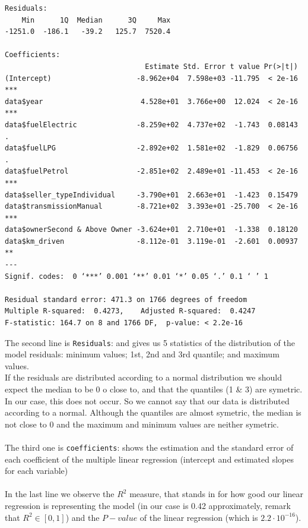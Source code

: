 \documentclass{article}
\begin{document}
\begin{itemize}
\begin{verbatim}
Residuals:
    Min      1Q  Median      3Q     Max 
-1251.0  -186.1   -39.2   125.7  7520.4 

Coefficients:
                                 Estimate Std. Error t value Pr(>|t|)    
(Intercept)                    -8.962e+04  7.598e+03 -11.795  < 2e-16 ***
data$year                       4.528e+01  3.766e+00  12.024  < 2e-16 ***
data$fuelElectric              -8.259e+02  4.737e+02  -1.743  0.08143 .  
data$fuelLPG                   -2.892e+02  1.581e+02  -1.829  0.06756 .  
data$fuelPetrol                -2.851e+02  2.489e+01 -11.453  < 2e-16 ***
data$seller_typeIndividual     -3.790e+01  2.663e+01  -1.423  0.15479    
data$transmissionManual        -8.721e+02  3.393e+01 -25.700  < 2e-16 ***
data$ownerSecond & Above Owner -3.624e+01  2.710e+01  -1.338  0.18120    
data$km_driven                 -8.112e-01  3.119e-01  -2.601  0.00937 ** 
---
Signif. codes:  0 ‘***’ 0.001 ‘**’ 0.01 ‘*’ 0.05 ‘.’ 0.1 ‘ ’ 1

Residual standard error: 471.3 on 1766 degrees of freedom
Multiple R-squared:  0.4273,    Adjusted R-squared:  0.4247 
F-statistic: 164.7 on 8 and 1766 DF,  p-value: < 2.2e-16
    \end{verbatim}
    
The second line is \texttt{Residuals}: and gives us 5 statistics of the distribution of the model residuals: minimum values; 1st, 2nd and 3rd quantile; and maximum values.\\
If the residuals are distributed according to a normal distribution we should expect the median to be 0 o close to, and that the quantiles (1 \& 3) are symetric. \\
In our case, this does not occur. So we cannot say that our data is distributed according to a normal. Although the quantiles are almost symetric,  the median is not close to 0 and the maximum and minimum values are neither symetric.
\\
\\
The third one is \texttt{coefficients}: shows the estimation and the standard error of each coefficient of the multiple linear regression (intercept and estimated slopes for each variable)
\\
\\
In the last line we observe the $R^2$ measure, that stands in for how good our linear regression is representing the model (in our case is 0.42 approximately, remark that $R^2\in[0,1]$) and the $P-value$ of the linear regression (which is $2.2\cdot 10^{-16}$).
\end{itemize}
    
\end{document}

